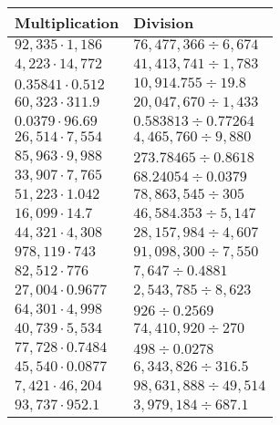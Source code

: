 \begin{longtable}[]{@{}ll@{}}
\toprule
Multiplication & Division\tabularnewline
\midrule
\endhead
\(92,335\cdot1,186\) & \(76,477,366÷6,674\)\tabularnewline
\(4,223\cdot14,772\) & \(41,413,741÷1,783\)\tabularnewline
\(0.35841\cdot 0.512\) & \(10,914.755÷19.8\)\tabularnewline
\(60,323\cdot311.9\) & \(20,047,670÷1,433\)\tabularnewline
\(0.0379\cdot96.69\) & \(0.583813÷0.77264\)\tabularnewline
\(26,514\cdot 7,554\) & \(4,465,760÷9,880\)\tabularnewline
\(85,963\cdot9,988\) & \(273.78465÷0.8618\)\tabularnewline
\(33,907\cdot7,765\) & \(68.24054÷0.0379\)\tabularnewline
\(51,223\cdot1.042\) & \(78,863,545÷305\)\tabularnewline
\(16,099\cdot14.7\) & \(46,584.353÷5,147\)\tabularnewline
\(44,321\cdot4,308\) & \(28,157,984÷4,607\)\tabularnewline
\(978,119\cdot743\) & \(91,098,300÷7,550\)\tabularnewline
\(82,512\cdot776\) & \(7,647÷0.4881\)\tabularnewline
\(27,004\cdot0.9677\) & \(2,543,785÷8,623\)\tabularnewline
\(64,301\cdot4,998\) & \(926÷0.2569\)\tabularnewline
\(40,739\cdot5,534\) & \(74,410,920÷270\)\tabularnewline
\(77,728\cdot0.7484\) & \(498÷0.0278\)\tabularnewline
\(45,540\cdot0.0877\) & \(6,343,826÷316.5\)\tabularnewline
\(7,421\cdot46,204\) & \(98,631,888÷49,514\)\tabularnewline
\(93,737\cdot952.1\) & \(3,979,184÷687.1\)\tabularnewline
\bottomrule
\end{longtable}

